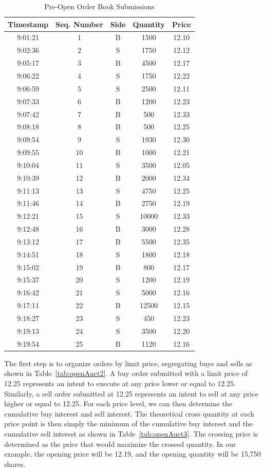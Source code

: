 \begin{table}[!ht]
   \centering
   \caption{Pre-Open Order Book Submissions\label{tab:openAuct}}
   \begin{tabular}{ccccc} 
	Timestamp & Seq. Number & Side & Quantity & Price \\ \hline
	9:01:21 & 1  &  B & 1500 &  12.10 \\
	9:02:36 & 2  &  S & 1750 & 12.12 \\	
	9:05:17 & 3  &  B & 4500  & 12.17 \\	
	9:06:22 & 4  &  S & 1750 & 12.22 \\
	9:06:59 & 5  &  S & 2500 & 12.11 \\	
	9:07:33 & 6 &  B & 1200 & 12.23 \\	
	9:07:42 & 7  &  B & 500 & 12.33 \\	
	9:08:18 & 8 &  B & 500 & 12.25 \\	
	9:09:54 & 9 &  S & 1930 & 12.30 \\	
	9:09:55 & 10 & B & 1000 & 12.21 \\	
	9:10:04 & 11 & S & 3500 & 12.05 \\	
	9:10:39 & 12 & B & 2000 & 12.34 \\	
	9:11:13 & 13 &  S & 4750 & 12.25 \\	
	9:11:46 &  14 & B  & 2750 & 12.19 \\	
	9:12:21 &  15 & S  & 10000 & 12.33 \\	
	9:12:48 &  16 & B  & 3000 & 12.28 \\	
	9:13:12 &  17 & B  & 5500 & 12.35 \\
	9:14:51 &  18 & S & 1800 & 12.18 \\
	9:15:02 &  19 & B & 800 & 12.17 \\
	9:15:37 &  20 & S & 1200 & 12.19 \\
	9:16:42 &  21 & S & 5000 & 12.16 \\
	9:17:11 &  22 & B & 12500 & 12.15 \\
	9:18:27 &  23 & S & 450 & 12.23 \\
	9:19:13 &  24 & S & 3500 & 12.20 \\	
	9:19:54 &  25 & B & 1120 & 12.16
   \end{tabular}
\end{table}

The first step is to organize orders by limit price, segregating buys and sells as shown in Table~\ref{tab:openAuct2}. A buy order submitted with a limit price of 12.25 represents an intent to execute at any price lower or equal to 12.25. Similarly, a sell order submitted at 12.25 represents an intent to sell at any price higher or equal to 12.25. For each price level, we can then determine the cumulative buy interest and sell interest. The theoretical cross quantity at each price point is then simply the minimum of the cumulative buy interest and the cumulative sell interest as shown in Table~\ref{tab:openAuct3}. The crossing price is determined as the price that would maximize the crossed quantity. In our example, the opening price will be 12.19, and the opening quantity will be 15,750 shares. \\

